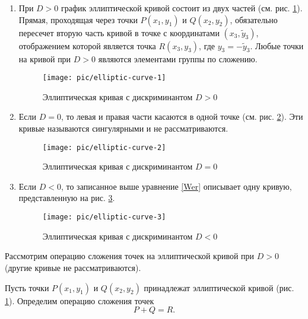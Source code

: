 \begin{enumerate}
    \item При $D>0$ график эллиптической кривой состоит из двух частей (см. рис. \ref{fig:elliptic-curve-1}). Прямая, проходящая через точки $P(x_1, y_1)$ и $Q(x_2, y_2)$, обязательно пересечет вторую часть кривой в точке с координатами $(x_3, \widetilde{y}_3)$, отображением которой является точка $R(x_3, y_3)$, где $y_3 = - \widetilde{y}_3$. Любые точки на кривой при $D>0$ являются элементами группы по сложению.
        \begin{figure}[!ht]
        	\centering
        	\texttt{[image: pic/elliptic-curve-1]}
            \caption{Эллиптическая кривая с дискриминантом $D>0$\label{fig:elliptic-curve-1}}
        \end{figure}
    \item Если $D=0$, то левая и правая части касаются в одной точке (см. рис. \ref{fig:elliptic-curve-2}). Эти кривые называются сингулярными и не рассматриваются.
        \begin{figure}[!ht]
        	\centering
        	\texttt{[image: pic/elliptic-curve-2]}
            \caption{Эллиптическая кривая с дискриминантом $D = 0$\label{fig:elliptic-curve-2}}
        \end{figure}
    \item Если $D<0$, то записанное выше уравнение \ref{Wer} описывает одну кривую, представленную на рис. \ref{fig:elliptic-curve-3}.
        \begin{figure}[!ht]
        	\centering
        	\texttt{[image: pic/elliptic-curve-3]}
            \caption{Эллиптическая кривая с дискриминантом $D < 0$\label{fig:elliptic-curve-3}}
        \end{figure}
\end{enumerate}

Рассмотрим операцию сложения точек на эллиптической кривой при $D>0$ (другие кривые не рассматриваются).

Пусть точки $P(x_1, y_1)$ и $Q(x_2, y_2)$ принадлежат эллиптической кривой (рис. \ref{fig:elliptic-curve-1}). Определим операцию сложения точек
    \[ P + Q = R. \]

